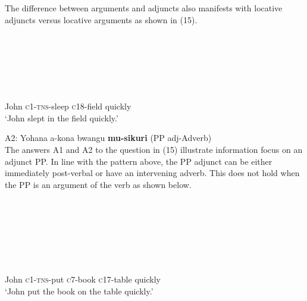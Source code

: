   The difference between arguments and adjuncts also manifests with locative adjuncts versus locative arguments as shown in (15).  

\begin{listWWviiiNumxlileveli}
\item \ea\label{ex:}
\\
\ea\label{ex:}
\\
\ea\label{ex:}
\\
\ea\label{ex:}
\\
\ea\label{ex:}
\\
\end{listWWviiiNumxlileveli}
       John     \textsc{c1-tns}{}-sleep  \textsc{c}18-field   quickly   \\
\glt   ‘John slept in the field quickly.’
\z

\gll A2:  Yohana  a-kona    bwangu  \textbf{mu-sikuri}  (PP adj-Adverb)\\
The answers A1 and A2 to the question in (15) illustrate information focus on an adjunct PP. In line with the pattern above, the PP adjunct can be either immediately post-verbal or have an intervening adverb. This does not hold when the PP is an argument of the verb as shown below.  

\begin{listWWviiiNumxlileveli}
\item \ea\label{ex:}
\\
\ea\label{ex:}
\\
\ea\label{ex:}
\\
\ea\label{ex:}
\\
\end{listWWviiiNumxlileveli}
\begin{listWWviiiNumxlileveli}
\ea\label{ex:}
\\
\end{listWWviiiNumxlileveli}
       John       \textsc{c1-tns-}put  \textsc{c}7-book   \textsc{c}17-table   quickly\\
\glt   ‘John put the book on the table quickly.’   
\z

